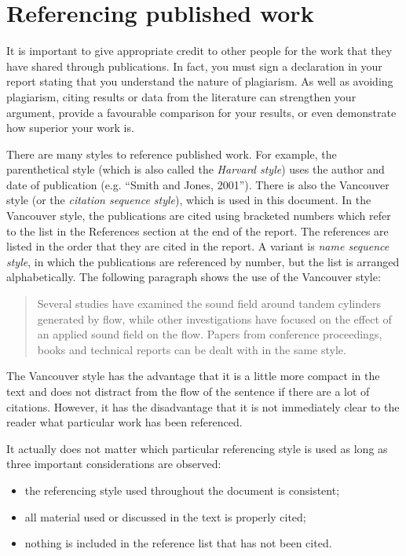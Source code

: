 \section{Referencing published work}
It is important to give appropriate credit to other people for the work that they have shared through publications. In fact, you must sign a declaration in your report stating that you understand the nature of plagiarism. As well as avoiding plagiarism, citing results or data from the literature can strengthen your argument, provide a favourable comparison for your results, or even demonstrate how superior your work is.

There are many styles to reference published work. For example, the parenthetical style (which is also called the \emph{Harvard style}) uses the author and date of publication (e.g. ``Smith and Jones, 2001''). There is also the Vancouver style (or the \emph{citation sequence style}), which is used in this document. In the Vancouver style, the publications are cited using bracketed numbers which refer to the list in the References section at the end of the report. The references are listed in the order that they are cited in the report. A variant is \emph{name sequence style}, in which the publications are referenced by number, but the list is arranged alphabetically. The following paragraph shows the use of the Vancouver style: 

\begin{quote}
	Several studies have examined the sound field around tandem cylinders generated by flow\cite{fitzpatrick2003flow,finnegan2010experimental}, while other investigations have focused on the effect of an applied sound field on the flow\cite{hall2003vortex}. Papers from conference proceedings\cite{jordan2001array}, books\cite{paidoussis2010fluid} and technical reports\cite{reyes2007power} can be dealt with in the same style.
\end{quote}

The Vancouver style has the advantage that it is a little more compact in the text and does not distract from the flow of the sentence if there are a lot of citations. However, it has the disadvantage that it is not immediately clear to the reader what particular work has been referenced.

It actually does not matter which particular referencing style is used as long as three important considerations are observed:
\begin{itemize}
	\item the referencing style used throughout the document is consistent;
	\item all material used or discussed in the text is properly cited;
	\item nothing is included in the reference list that has not been cited.
\end{itemize}

